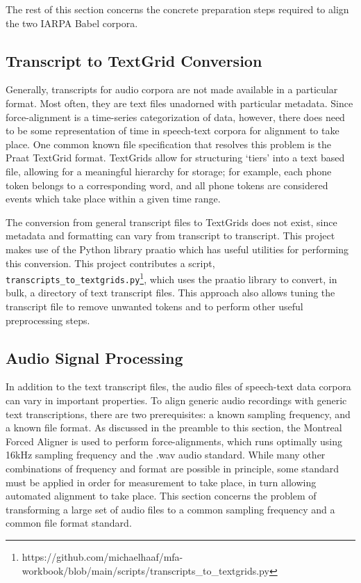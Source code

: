 \documentclass[11pt]{article}
\begin{document}
The rest of this section concerns the concrete preparation steps required to align the two IARPA Babel corpora.

\subsection{Transcript to TextGrid Conversion}

Generally, transcripts for audio corpora are not made available in a particular format. Most often, they are text files unadorned with particular metadata. Since force-alignment is a time-series categorization of data, however, there does need to be some representation of time in speech-text corpora for alignment to take place. One common known file specification that resolves this problem is the Praat\cite{noauthor_praat_nodate} TextGrid format. TextGrids allow for structuring ‘tiers’ into a text based file, allowing for a meaningful hierarchy for storage; for example, each phone token belongs to a corresponding word, and all phone tokens are considered events which take place within a given time range.

The conversion from general transcript files to TextGrids does not exist, since metadata and formatting can vary from transcript to transcript. This project makes use of the Python library praatio\cite{tim_mahrt_praatio_2016} which has useful utilities for performing this conversion. This project contributes a script, \verb|transcripts_to_textgrids.py|\footnote{https://github.com/michaelhaaf/mfa-workbook/blob/main/scripts/transcripts\_to\_textgrids.py}, which uses the praatio library to convert, in bulk, a directory of text transcript files. This approach also allows tuning the transcript file to remove unwanted tokens and to perform other useful preprocessing steps.

\subsection{Audio Signal Processing}

In addition to the text transcript files, the audio files of speech-text data corpora can vary in important properties. To align generic audio recordings with generic text transcriptions, there are two prerequisites: a known sampling frequency, and a known file format. As discussed in the preamble to this section, the Montreal Forced Aligner is used to perform force-alignments, which runs optimally using 16kHz sampling frequency and the .wav audio standard. While many other combinations of frequency and format are possible in principle, some standard must be applied in order for measurement to take place, in turn allowing automated alignment to take place. This section concerns the problem of transforming a large set of audio files to a common sampling frequency and a common file format standard.
\end{document}
